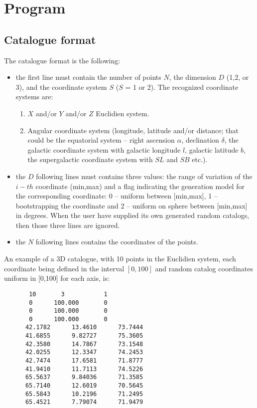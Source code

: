 \clearpage
\newpage

\section{Program}

\subsection{Catalogue format}
The catalogue format is the following:
\begin{itemize}
\item the first line must contain the number of points $N$, the
  dimension $D$ (1,2, or 3), and the coordinate system $S$ ($S$ = 1 or
  2).  The recognized coordinate systems are:
  \begin{enumerate}
  \item $X$ and/or $Y$ and/or $Z$ Euclidien system.
  \item Angular coordinate system (longitude, latitude and/or
    distance; that could be the equatorial system -- right ascension
    $\alpha$, declination $\delta$, the galactic coordinate system
    with galactic longitude $l$, galactic latitude $b$, the
    supergalactic coordinate system with $SL$ and $SB$ etc.).
  \end{enumerate}
\item the $D$ following lines must contains three values: the range of
  variation of the $i-th$ coordinate (min,max) and a flag indicating
  the generation model for the corresponding coordinate: 0 -- uniform
  between [min,max], 1 -- bootstrapping the coordinate and 2 -- uniform
  on sphere between [min,max] in degrees. When the user have supplied
  its own generated random catalogs, then those three lines are
  ignored.
\item the $N$ following lines contains the coordinates of the points.
\end{itemize}

An example of a 3D catalogue, with 10 points in the Euclidien system,
each coordinate being defined in the interval $[0,100]$ and random
catalog coordinates uniform in [0,100] for each axis, is:
\begin{verbatim}
       10       3           1
       0      100.000       0
       0      100.000       0
       0      100.000       0
      42.1782      13.4610      73.7444
      41.6855      9.82727      75.3605
      42.3580      14.7867      73.1548
      42.0255      12.3347      74.2453
      42.7474      17.6581      71.8777
      41.9410      11.7113      74.5226
      65.5637      9.84036      71.3585
      65.7140      12.6019      70.5645
      65.5843      10.2196      71.2495
      65.4521      7.79074      71.9479
\end{verbatim}



